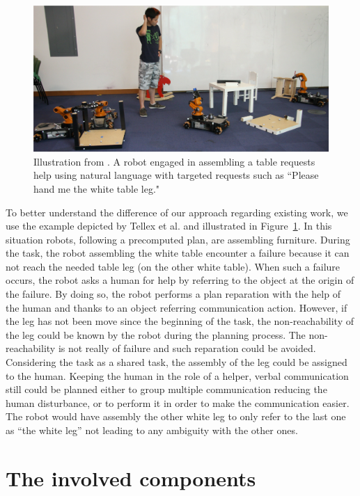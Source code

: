 \begin{figure}[!ht]
\centering
\includegraphics[scale=0.25]{figures/chapter5/tellex.png}
\caption{\label{fig:chap5_tellex} Illustration from \cite{tellex_2014_asking}.
A robot engaged in assembling a table requests help using natural language with targeted requests such as “Please hand me the white table leg." }
\end{figure}

To better understand the difference of our approach regarding existing work, we use the example depicted by Tellex et al. \cite{tellex_2014_asking} and illustrated in Figure~\ref{fig:chap5_tellex}. In this situation robots, following a precomputed plan, are assembling furniture. During the task, the robot assembling the white table encounter a failure because it can not reach the needed table leg (on the other white table). When such a failure occurs, the robot asks a human for help by referring to the object at the origin of the failure. By doing so, the robot performs a plan reparation with the help of the human and thanks to an object referring communication action. However, if the leg has not been move since the beginning of the task, the non-reachability of the leg could be known by the robot during the planning process. The non-reachability is not really of failure and such reparation could be avoided. Considering the task as a shared task, the assembly of the leg could be assigned to the human. Keeping the human in the role of a helper, verbal communication still could be planned either to group multiple communication reducing the human disturbance, or to perform it in order to make the communication easier. The robot would have assembly the other white leg to only refer to the last one as ``the white leg'' not leading to any ambiguity with the other ones.


\section{The involved components}

